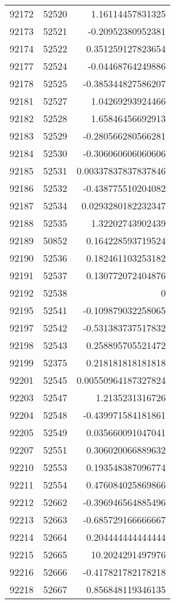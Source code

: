 \begin{tabular}{r | r | r}
92172 & 52520 & 1.16114457831325 \\
92173 & 52521 & -0.20952380952381 \\
92174 & 52522 & 0.351259127823654 \\
92177 & 52524 & -0.04468764249886 \\
92178 & 52525 & -0.385344827586207 \\
92181 & 52527 & 1.04269293924466 \\
92182 & 52528 & 1.65846456692913 \\
92183 & 52529 & -0.280566280566281 \\
92184 & 52530 & -0.306060606060606 \\
92185 & 52531 & 0.00337837837837846 \\
92186 & 52532 & -0.438775510204082 \\
92187 & 52534 & 0.0293280182232347 \\
92188 & 52535 & 1.32202743902439 \\
92189 & 50852 & 0.164228593719524 \\
92190 & 52536 & 0.182461103253182 \\
92191 & 52537 & 0.130772072404876 \\
92192 & 52538 & 0 \\
92195 & 52541 & -0.109879032258065 \\
92197 & 52542 & -0.531383737517832 \\
92198 & 52543 & 0.258895705521472 \\
92199 & 52375 & 0.218181818181818 \\
92201 & 52545 & 0.00550964187327824 \\
92203 & 52547 & 1.2135231316726 \\
92204 & 52548 & -0.439971584181861 \\
92205 & 52549 & 0.035660091047041 \\
92207 & 52551 & 0.306020066889632 \\
92210 & 52553 & 0.193548387096774 \\
92211 & 52554 & 0.476084025869866 \\
92212 & 52662 & -0.396946564885496 \\
92213 & 52663 & -0.685729166666667 \\
92214 & 52664 & 0.204444444444444 \\
92215 & 52665 & 10.2024291497976 \\
92216 & 52666 & -0.417821782178218 \\
92218 & 52667 & 0.856848119346135 \\

\end{tabular}
